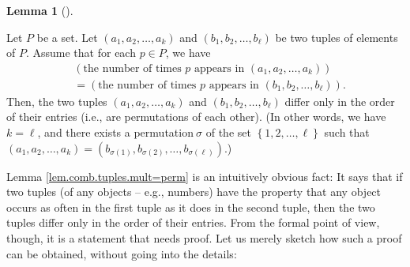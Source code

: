 \documentclass[numbers=enddot,12pt,final,onecolumn,notitlepage]{scrartcl}%
\numberwithin{exer}{subsection}
\theoremstyle{definition}
\newtheorem{lem}[theo]{Lemma}
\newenvironment{lemma}[1][]
{\begin{lem}[#1]\begin{leftbar}}
{\end{leftbar}\end{lem}}
\begin{document}
\begin{lemma}
\label{lem.comb.tuples.mult=perm}Let $P$ be a set. Let $\left(  a_{1}%
,a_{2},\ldots,a_{k}\right)  $ and $\left(  b_{1},b_{2},\ldots,b_{\ell}\right)
$ be two tuples of elements of $P$. Assume that for each $p\in P$, we have%
\begin{align}
&  \left(  \text{the number of times }p\text{ appears in }\left(  a_{1}%
,a_{2},\ldots,a_{k}\right)  \right) \nonumber\\
&  =\left(  \text{the number of times }p\text{ appears in }\left(  b_{1}%
,b_{2},\ldots,b_{\ell}\right)  \right)  .
\label{eq.lem.comb.tuples.mult=perm.ass}%
\end{align}
Then, the two tuples $\left(  a_{1},a_{2},\ldots,a_{k}\right)  $ and $\left(
b_{1},b_{2},\ldots,b_{\ell}\right)  $ differ only in the order of their
entries (i.e., are permutations of each other). (In other words, we have
$k=\ell$, and there exists a permutation$\ \sigma$ of the set $\left\{
1,2,\ldots,\ell\right\}  $ such that $\left(  a_{1},a_{2},\ldots,a_{k}\right)
=\left(  b_{\sigma\left(  1\right)  },b_{\sigma\left(  2\right)  }%
,\ldots,b_{\sigma\left(  \ell\right)  }\right)  $.)
\end{lemma}

Lemma \ref{lem.comb.tuples.mult=perm} is an intuitively obvious fact: It says
that if two tuples (of any objects -- e.g., numbers) have the property that
any object occurs as often in the first tuple as it does in the second tuple,
then the two tuples differ only in the order of their entries. From the formal
point of view, though, it is a statement that needs proof. Let us merely
sketch how such a proof can be obtained, without going into the details:
\end{document}

